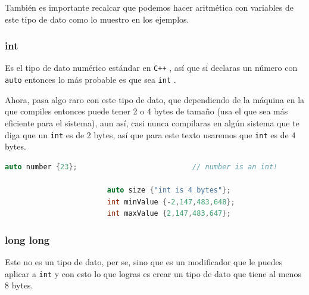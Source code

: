 \documentclass[12pt, fleqn]{report}                             %
\theoremstyle{break}                                            %
\newcommand{\textCode}[1]  { \texttt{#1} }                      %
\newcommand{\Cpp}{\ignorespaces\textCode{C++}}                  %
\begin{document}
                    También es importante recalcar que podemos hacer aritmética con variables de este tipo
                    de dato como lo muestro en los ejemplos.


                \clearpage
                \subsubsection{int}

                    Es el tipo de dato numérico estándar en \Cpp, así que si declaras un número
                    con \textCode{auto} entonces lo más probable es que sea \textCode{int}.

                    Ahora, pasa algo raro con este tipo de dato, que dependiendo de la máquina
                    en la que compiles entonces puede tener 2 o 4 bytes de tamaño (usa el que
                    sea más eficiente para el sistema), aun así, casi nunca compilaras en 
                    algún sistema que te diga que un \textCode{int} es de 2 bytes, así que para
                    este texto usaremos que \textCode{int} es de 4 bytes.
                    \begin{lstlisting}[language=C++, gobble=24]
                        auto number {23};                           // number is an int!

                        auto size {"int is 4 bytes"};
                        int minValue {-2,147,483,648};
                        int maxValue {2,147,483,647};
                    \end{lstlisting}

                \subsubsection{long long}

                    Este no es un tipo de dato, per se, sino que es un modificador que le puedes aplicar
                    a \textCode{int} y con esto lo que logras es crear un tipo de dato que tiene al menos 8 bytes.
\end{document}
